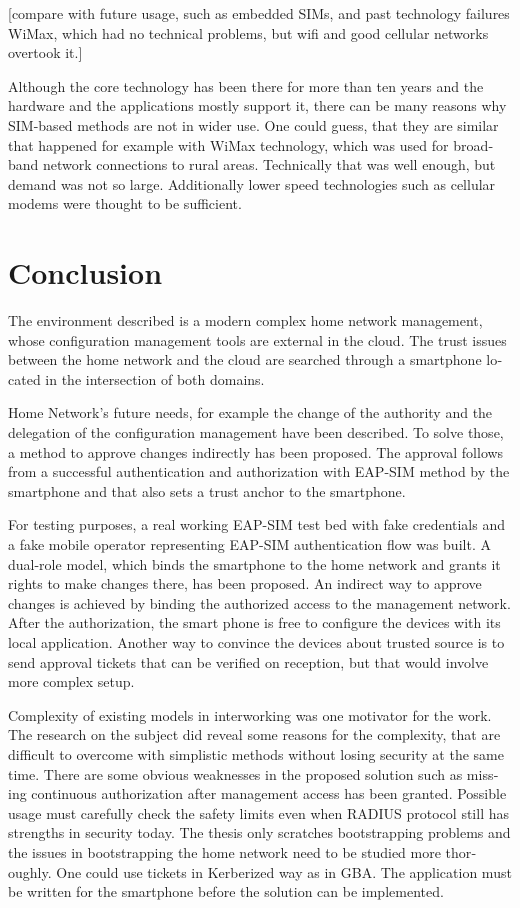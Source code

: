 \documentclass[12pt,a4paper,english]{tutthesis}
\begin{document}
\begin{otherlanguage}{english}
{[compare with future usage, such as embedded SIMs, and past technology 
failures WiMax, which had no technical problems, but wifi and good
cellular networks overtook it.]

Although the core technology has been there for more than ten years and
the hardware and the applications mostly support it, 
there can be many reasons why SIM-based methods are not in wider use. 
One could guess, that they are similar that happened for example with 
WiMax technology, which was used for broadband network connections to
rural areas. Technically that was well enough, but demand was not so
large. Additionally lower speed technologies such as cellular modems
were thought to be sufficient.


\chapter{Conclusion}
\label{sec-7}



The environment described is a modern complex home network management, whose configuration
management tools are external in the cloud. The trust issues between the
home network and the cloud are searched through a 
smartphone located in the intersection of both domains.

Home Network's future needs, for example  the change of the authority and the
delegation of the configuration management have been described. 
To solve those, a method to approve changes indirectly has been proposed. The approval
follows from a successful authentication and authorization with EAP-SIM
method by the smartphone and that also sets a trust anchor to the smartphone.


For testing purposes, a real working EAP-SIM test bed with fake credentials and
a fake mobile operator representing EAP-SIM authentication flow was
built. A dual-role model, which binds the smartphone to the home network and
grants it rights to make changes there, has been proposed.  
An indirect way to approve changes is achieved by binding the authorized
access to the management network. After the authorization, the smart
phone is free to configure the devices with its local application.
Another way to convince the
devices about trusted source is to send approval tickets that can
be verified on reception, but that would involve more complex setup.

Complexity of existing models in interworking was one motivator for
the work. The research  on the subject did reveal some reasons 
for the complexity, that are difficult to overcome with simplistic 
methods without losing security at the same time.
There are some obvious weaknesses in the proposed solution such as 
missing continuous authorization after management access has been granted.
 Possible usage must carefully check the safety limits even when RADIUS protocol still
has strengths in security today. The thesis only scratches bootstrapping
problems and the issues in bootstrapping the home network need to be studied
more thoroughly. One could use tickets in Kerberized way as in GBA.
The application must be written for the smartphone before the solution
can be implemented.

}
\end{otherlanguage}
\end{document}
